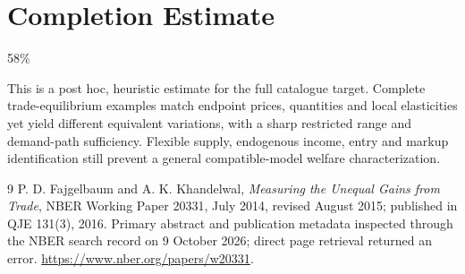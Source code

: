 \documentclass[11pt]{article}
\begin{document}
\section{Completion Estimate}
58\%

This is a post hoc, heuristic estimate for the full catalogue target.
Complete trade-equilibrium examples match endpoint prices, quantities and local elasticities yet yield different equivalent variations, with a sharp restricted range and demand-path sufficiency. Flexible supply, endogenous income, entry and markup identification still prevent a general compatible-model welfare characterization.

\begin{thebibliography}{9}
 P. D. Fajgelbaum and A. K. Khandelwal, \emph{Measuring the Unequal Gains from Trade}, NBER Working Paper 20331, July 2014, revised August 2015; published in QJE 131(3), 2016. Primary abstract and publication metadata inspected through the NBER search record on 9 October 2026; direct page retrieval returned an error. \url{https://www.nber.org/papers/w20331}.
\end{thebibliography}
\end{document}

